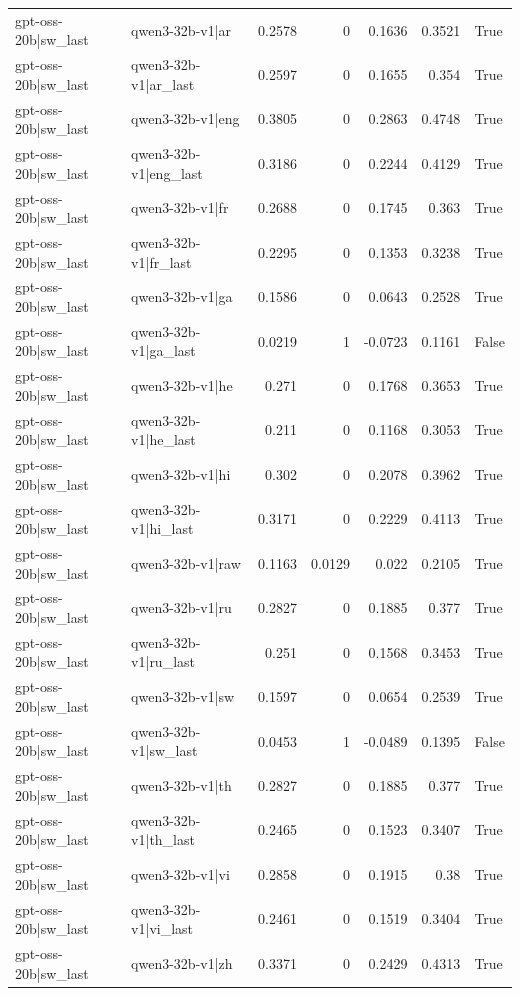 \begin{table}
\begin{tabular}{l l r r r r l}
gpt-oss-20b|sw_last & qwen3-32b-v1|ar & 0.2578 & 0 & 0.1636 & 0.3521 & True \\
gpt-oss-20b|sw_last & qwen3-32b-v1|ar_last & 0.2597 & 0 & 0.1655 & 0.354 & True \\
gpt-oss-20b|sw_last & qwen3-32b-v1|eng & 0.3805 & 0 & 0.2863 & 0.4748 & True \\
gpt-oss-20b|sw_last & qwen3-32b-v1|eng_last & 0.3186 & 0 & 0.2244 & 0.4129 & True \\
gpt-oss-20b|sw_last & qwen3-32b-v1|fr & 0.2688 & 0 & 0.1745 & 0.363 & True \\
gpt-oss-20b|sw_last & qwen3-32b-v1|fr_last & 0.2295 & 0 & 0.1353 & 0.3238 & True \\
gpt-oss-20b|sw_last & qwen3-32b-v1|ga & 0.1586 & 0 & 0.0643 & 0.2528 & True \\
gpt-oss-20b|sw_last & qwen3-32b-v1|ga_last & 0.0219 & 1 & -0.0723 & 0.1161 & False \\
gpt-oss-20b|sw_last & qwen3-32b-v1|he & 0.271 & 0 & 0.1768 & 0.3653 & True \\
gpt-oss-20b|sw_last & qwen3-32b-v1|he_last & 0.211 & 0 & 0.1168 & 0.3053 & True \\
gpt-oss-20b|sw_last & qwen3-32b-v1|hi & 0.302 & 0 & 0.2078 & 0.3962 & True \\
gpt-oss-20b|sw_last & qwen3-32b-v1|hi_last & 0.3171 & 0 & 0.2229 & 0.4113 & True \\
gpt-oss-20b|sw_last & qwen3-32b-v1|raw & 0.1163 & 0.0129 & 0.022 & 0.2105 & True \\
gpt-oss-20b|sw_last & qwen3-32b-v1|ru & 0.2827 & 0 & 0.1885 & 0.377 & True \\
gpt-oss-20b|sw_last & qwen3-32b-v1|ru_last & 0.251 & 0 & 0.1568 & 0.3453 & True \\
gpt-oss-20b|sw_last & qwen3-32b-v1|sw & 0.1597 & 0 & 0.0654 & 0.2539 & True \\
gpt-oss-20b|sw_last & qwen3-32b-v1|sw_last & 0.0453 & 1 & -0.0489 & 0.1395 & False \\
gpt-oss-20b|sw_last & qwen3-32b-v1|th & 0.2827 & 0 & 0.1885 & 0.377 & True \\
gpt-oss-20b|sw_last & qwen3-32b-v1|th_last & 0.2465 & 0 & 0.1523 & 0.3407 & True \\
gpt-oss-20b|sw_last & qwen3-32b-v1|vi & 0.2858 & 0 & 0.1915 & 0.38 & True \\
gpt-oss-20b|sw_last & qwen3-32b-v1|vi_last & 0.2461 & 0 & 0.1519 & 0.3404 & True \\
gpt-oss-20b|sw_last & qwen3-32b-v1|zh & 0.3371 & 0 & 0.2429 & 0.4313 & True \\

\end{tabular}
\end{table}
